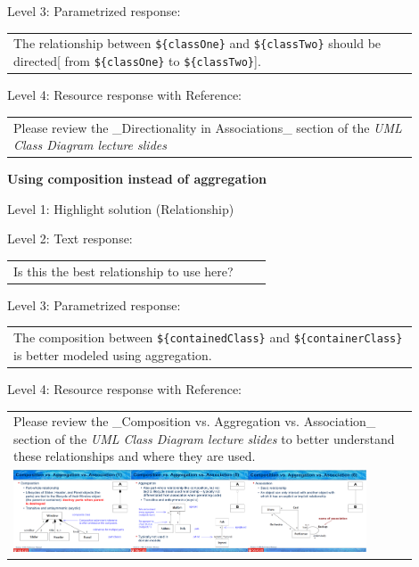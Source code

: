 \noindent Level 3: Parametrized response: \medskip

\begin{tabular}{|p{0.9\linewidth}}
The relationship between \verb|${classOne}| and \verb|${classTwo}| should be directed[ from \verb|${classOne}| to \verb|${classTwo}|].
\end{tabular} \medskip

\noindent Level 4: Resource response with Reference: \medskip

\begin{tabular}{|p{0.9\linewidth}}
Please review the _Directionality in Associations_ section of the \textit{UML Class Diagram lecture slides}
\end{tabular} \medskip


\noindent \textbf{Using composition instead of aggregation} \medskip

\noindent Level 1: Highlight solution (Relationship) \medskip

\noindent Level 2: Text response: \medskip

\begin{tabular}{|p{0.9\linewidth}}
Is this the best relationship to use here?
\end{tabular} \medskip

\noindent Level 3: Parametrized response: \medskip

\begin{tabular}{|p{0.9\linewidth}}
The composition between \verb|${containedClass}| and \verb|${containerClass}| is better modeled using aggregation.
\end{tabular} \medskip

\noindent Level 4: Resource response with Reference: \medskip

\begin{tabular}{|p{0.9\linewidth}}
Please review the _Composition vs. Aggregation vs. Association_ section of 
the \textit{UML Class Diagram lecture slides} to 
better understand these relationships and where they are used.

\\
\includegraphics[width=0.9\textwidth]{images/composition_aggregation_association.png}
\end{tabular} \medskip


